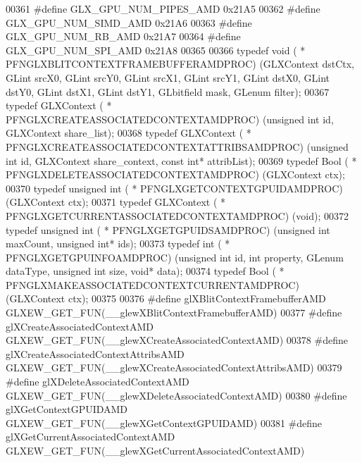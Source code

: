 \begin{DoxyCode}
00361 \textcolor{preprocessor}{#define GLX\_GPU\_NUM\_PIPES\_AMD 0x21A5}
00362 \textcolor{preprocessor}{#define GLX\_GPU\_NUM\_SIMD\_AMD 0x21A6}
00363 \textcolor{preprocessor}{#define GLX\_GPU\_NUM\_RB\_AMD 0x21A7}
00364 \textcolor{preprocessor}{#define GLX\_GPU\_NUM\_SPI\_AMD 0x21A8}
00365 
00366 \textcolor{keyword}{typedef} void ( * PFNGLXBLITCONTEXTFRAMEBUFFERAMDPROC) (GLXContext dstCtx, GLint 
      srcX0, GLint srcY0, GLint srcX1, GLint srcY1, GLint dstX0, GLint dstY0, GLint 
      dstX1, GLint dstY1, GLbitfield mask, GLenum filter);
00367 \textcolor{keyword}{typedef} GLXContext ( * PFNGLXCREATEASSOCIATEDCONTEXTAMDPROC) (\textcolor{keywordtype}{unsigned} \textcolor{keywordtype}{int} id, GLXContext share\_list);
00368 \textcolor{keyword}{typedef} GLXContext ( * PFNGLXCREATEASSOCIATEDCONTEXTATTRIBSAMDPROC) (\textcolor{keywordtype}{unsigned} \textcolor{keywordtype}{int} 
      id, GLXContext share\_context, \textcolor{keyword}{const} \textcolor{keywordtype}{int}* attribList);
00369 \textcolor{keyword}{typedef} Bool ( * PFNGLXDELETEASSOCIATEDCONTEXTAMDPROC) (GLXContext ctx);
00370 \textcolor{keyword}{typedef} \textcolor{keywordtype}{unsigned} int ( * PFNGLXGETCONTEXTGPUIDAMDPROC) (GLXContext ctx);
00371 \textcolor{keyword}{typedef} GLXContext ( * PFNGLXGETCURRENTASSOCIATEDCONTEXTAMDPROC) (void);
00372 \textcolor{keyword}{typedef} \textcolor{keywordtype}{unsigned} int ( * PFNGLXGETGPUIDSAMDPROC) (\textcolor{keywordtype}{unsigned} \textcolor{keywordtype}{int} maxCount, \textcolor{keywordtype}{unsigned} \textcolor{keywordtype}{int}* 
      ids);
00373 \textcolor{keyword}{typedef} int ( * PFNGLXGETGPUINFOAMDPROC) (\textcolor{keywordtype}{unsigned} \textcolor{keywordtype}{int} id, \textcolor{keywordtype}{int} property, GLenum 
      dataType, \textcolor{keywordtype}{unsigned} \textcolor{keywordtype}{int} size, \textcolor{keywordtype}{void}* data);
00374 \textcolor{keyword}{typedef} Bool ( * PFNGLXMAKEASSOCIATEDCONTEXTCURRENTAMDPROC) (GLXContext ctx);
00375 
00376 \textcolor{preprocessor}{#define glXBlitContextFramebufferAMD GLXEW\_GET\_FUN(\_\_glewXBlitContextFramebufferAMD)}
00377 \textcolor{preprocessor}{#define glXCreateAssociatedContextAMD GLXEW\_GET\_FUN(\_\_glewXCreateAssociatedContextAMD)}
00378 \textcolor{preprocessor}{#define glXCreateAssociatedContextAttribsAMD GLXEW\_GET\_FUN(\_\_glewXCreateAssociatedContextAttribsAMD)}
00379 \textcolor{preprocessor}{#define glXDeleteAssociatedContextAMD GLXEW\_GET\_FUN(\_\_glewXDeleteAssociatedContextAMD)}
00380 \textcolor{preprocessor}{#define glXGetContextGPUIDAMD GLXEW\_GET\_FUN(\_\_glewXGetContextGPUIDAMD)}
00381 \textcolor{preprocessor}{#define glXGetCurrentAssociatedContextAMD GLXEW\_GET\_FUN(\_\_glewXGetCurrentAssociatedContextAMD)}

\end{DoxyCode}
